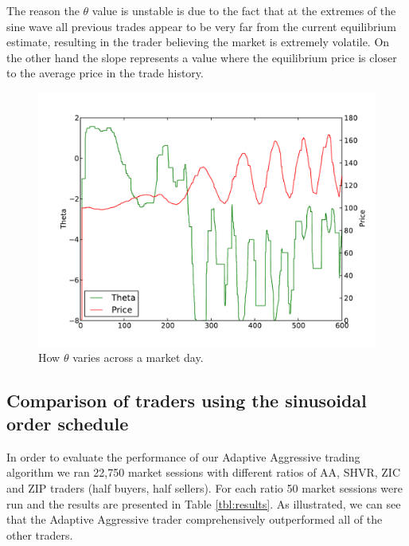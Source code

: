 \documentclass[preprint]{acm_proc_article-sp} %
\begin{document}
The reason the $\theta$ value is unstable is due to the fact that at the
extremes of the sine wave all previous trades appear to be very far from the
current equilibrium estimate, resulting in the trader believing the market is
extremely volatile. On the other hand the slope represents a value where the
equilibrium price is closer to the average price in the trade history.
\begin{figure}[H]
  \centering
  \includegraphics[width=\columnwidth]{graphs_and_stats/graph_theta_vs_time.pdf}
  \caption{How $\theta$ varies across a market day.}
  \label{fig:theta_v_time}
\end{figure}

\subsection{Comparison of traders using the sinusoidal order schedule}
\label{sec:eval_schedule}
In order to evaluate the performance of our Adaptive Aggressive trading
algorithm we ran 22,750 market sessions with different ratios of AA, SHVR, ZIC
and ZIP traders (half buyers, half sellers). For each ratio 50 market sessions
were run and the results are presented in Table \ref{tbl:results}. As
illustrated, we can see that the Adaptive Aggressive trader comprehensively outperformed all of the other
traders.
\end{document}

